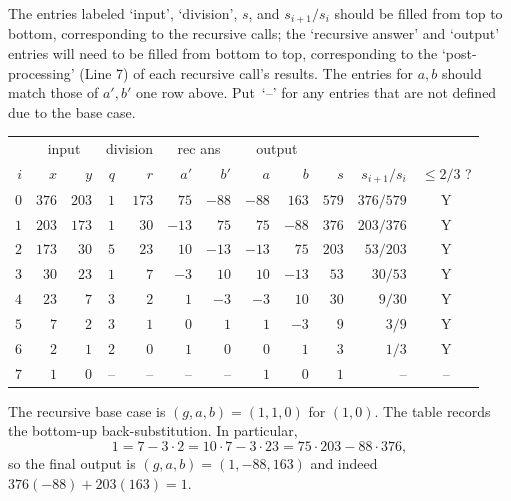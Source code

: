 \documentclass[11pt,addpoints,answers]{exam}
\begin{document}
\begin{questions}
\begin{parts}
    The entries labeled `input', `division', $s$, and $s_{i+1}/s_i$ should be filled from top to bottom, corresponding to the recursive calls; the `recursive answer' and `output' entries will need to be filled from bottom to top, corresponding to the `post-processing' (Line 7) of each recursive call's results.
    The entries for $a,b$ should match those of $a',b'$ one row above.
    Put~`--' for any entries that are not defined due to the base case. 

  \begin{solution}
      \begin{table}[H]\centering
        \begin{tabular}{r|rr|rr|rr|rr|rrc}
          & \multicolumn{2}{c|}{input} & \multicolumn{2}{|c|}{division} & \multicolumn{2}{|c|}{rec ans} & \multicolumn{2}{|c|}{output} \\
          $i$ & $x$   & $y$  & $q$ & $r$  & $a'$ & $b'$ & $a$ & $b$ & $s$ & $s_{i+1}/s_{i}$ & $\leq 2/3$ ? \\ \hline
          $0$ & $376$ & $203$ & $1$ & $173$ & $75$ & $-88$ & $-88$ & $163$ & $579$ & $376/579$ & Y \\
          $1$ & $203$ & $173$ & $1$ & $30$ & $-13$ & $75$ & $75$ & $-88$ & $376$ & $203/376$ & Y \\
          $2$ & $173$ & $30$ & $5$ & $23$ & $10$ & $-13$ & $-13$ & $75$ & $203$ & $53/203$ & Y \\
          $3$ & $30$ & $23$ & $1$ & $7$ & $-3$ & $10$ & $10$ & $-13$ & $53$ & $30/53$ & Y \\
          $4$ & $23$ & $7$ & $3$ & $2$ & $1$ & $-3$ & $-3$ & $10$ & $30$ & $9/30$ & Y \\
          $5$ & $7$ & $2$ & $3$ & $1$ & $0$ & $1$ & $1$ & $-3$ & $9$ & $3/9$ & Y \\
          $6$ & $2$ & $1$ & $2$ & $0$ & $1$ & $0$ & $0$ & $1$ & $3$ & $1/3$ & Y \\
          $7$ & $1$ & $0$ & -- & -- & -- & -- & $1$ & $0$ & $1$ & -- & -- \\
        \end{tabular}
      \end{table}

    The recursive base case is $(g,a,b)=(1,1,0)$ for $(1,0)$.  The
    table records the bottom-up back-substitution.  In particular,
    \[
    1=7-3\cdot2=10\cdot7-3\cdot23=75\cdot203-88\cdot376,
    \]
    so the final output is $(g,a,b)=(1,-88,163)$ and indeed
    $376(-88)+203(163)=1$.
    \end{solution}
  \end{parts}




\end{questions}
\end{document}

